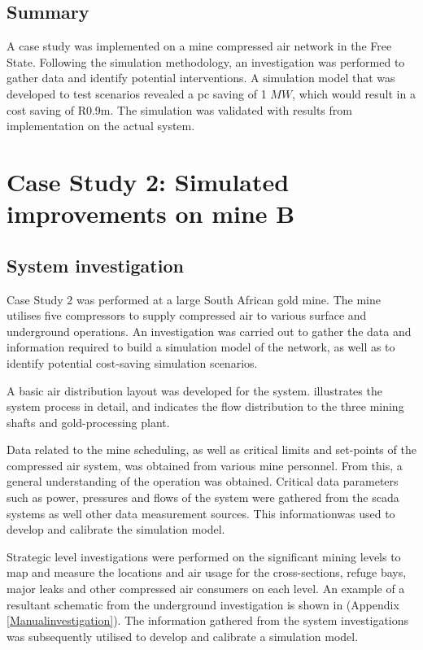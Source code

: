 \subsection{Summary}
A case study was implemented on a mine compressed air network in the Free State. Following the simulation methodology, an investigation was performed to gather data and identify potential interventions. A simulation model that was developed to test scenarios revealed a \gls{pc} saving of 1 $MW$, which would result in a cost saving of R0.9m. The simulation was validated with results from implementation on the actual system.
\section{Case Study 2: Simulated improvements on mine B}
	\subsection{System investigation}
	Case Study 2 was performed at a large South African gold mine. The mine utilises five compressors to supply compressed air to various surface and underground operations. An investigation was carried out to gather the data and information required to build a simulation model of the network, as well as to identify potential cost-saving simulation scenarios.
	\par 
	A basic air distribution layout was developed for the system.  illustrates the system process in detail, and indicates the flow distribution to the three mining shafts and gold-processing plant.
	\par 
	Data related to the mine scheduling, as well as critical limits and  set-points of the compressed air system, was obtained from various mine personnel. From this, a general understanding of the operation was obtained.  Critical data parameters such as power, pressures and flows of the system were gathered from the \acrfull{scada} systems as well other data measurement sources. This informationwas used to develop and calibrate the simulation model.
	\par 
	\clearpage
	Strategic level investigations were performed on the significant mining levels to map and measure the locations and air usage for the cross-sections, refuge bays, major leaks and other compressed air consumers on each level. An example of a resultant schematic from the underground investigation is shown in  (Appendix \ref{Manualinvestigation}). The information gathered from the system investigations was subsequently utilised to develop and calibrate a simulation model.
